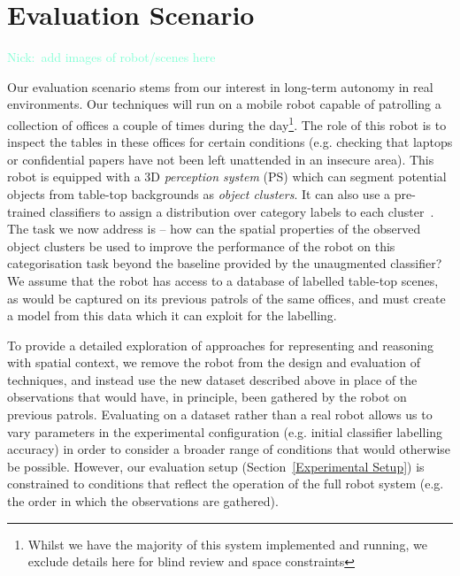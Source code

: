 \documentclass[letterpaper]{article}
\newif\ifdraft
\newcommand{\nick}[1]{\textcolor{Aquamarine}{Nick:\ #1}}
\newcommand{\points}[1]{\textcolor{Gray}{points-to-remember:\ #1}}
\newcommand{\nick}[1]{}
\newcommand{\points}[1]{}
\begin{document}
\ifdraft
\points{
\subsubsection*{Points Discussed}
\begin{enumerate}
	\item Details
	\item Why?
	\item Histogram of all objects in data set
	\item Scatter plot like in Adria thesis - centroids of objects and motivate learning that model.
\end{enumerate}
}
\fi

\section{Evaluation Scenario} %
\label{sec:evaluation_scenario}

\nick{add images of robot/scenes here} 

Our evaluation scenario stems from our interest in long-term autonomy in real environments. Our techniques will run on a mobile robot capable of patrolling a collection of offices a couple of times during the day\footnote{Whilst we have the majority of this system implemented and running, we exclude details here for blind review and space constraints}. The role of this robot is to inspect the tables in these offices for certain conditions (e.g. checking that laptops or confidential papers have not been left unattended in an insecure area). This robot is equipped with a 3D \textit{perception system} (PS) which can segment potential objects from table-top backgrounds as \emph{object clusters}. It can also use a pre-trained classifiers to assign a distribution over category labels to each cluster~\cite{aldoma2012using}. The task we now address is -- how can the spatial properties of the observed object clusters be used to improve the performance of the robot on this categorisation task beyond the baseline provided by the unaugmented classifier? We assume that the robot has access to a database of labelled table-top scenes, as would be captured on its previous patrols of the same offices, and must create a model from this data which it can exploit for the labelling. 

To provide a detailed exploration of approaches for representing and reasoning with spatial context, we remove the robot from the design and evaluation of techniques, and instead use the new dataset described above in place of the observations that would have, in principle, been gathered by the robot on previous patrols. Evaluating on a dataset rather than a real robot  allows us to vary parameters in the experimental configuration (e.g. initial classifier labelling accuracy) in order to consider a broader range of conditions that would otherwise be possible. However, our evaluation setup (Section~\ref{Experimental Setup}) is constrained to conditions that reflect the operation of the full robot system (e.g. the order in which the observations are gathered). 
\end{document}
